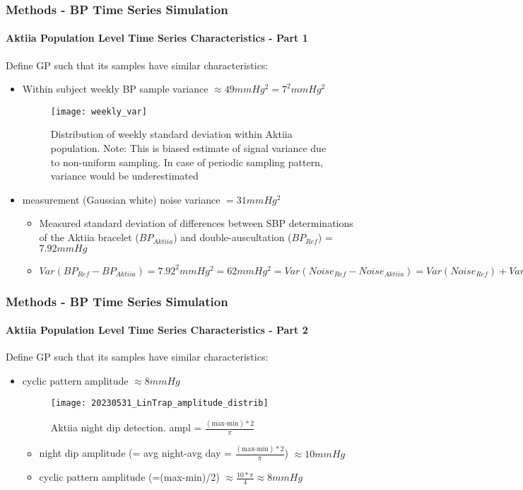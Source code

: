 \documentclass[
	8pt, %
]{beamer}
\begin{document}
\begin{frame}
	\frametitle{Methods - BP Time Series Simulation}
	\framesubtitle{Aktiia Population Level Time Series Characteristics - Part 1}

	Define GP such that its samples have similar characteristics:

	\begin{itemize}
		\item Within subject weekly BP sample variance $\approx 49 mmHg^2 = 7^2 mmHg^2$
			\begin{figure}
					\texttt{[image: weekly\_var]}
					\caption{Distribution of weekly standard deviation within Aktiia population.
					Note: This is biased estimate of signal variance due to non-uniform sampling. In case
					of periodic sampling pattern, variance would be underestimated}
			\end{figure}
		\item measurement (Gaussian white) noise variance $=31 mmHg^2$
		\begin{itemize}
			\item Measured standard deviation of differences between SBP determinations of the Aktiia bracelet
			($BP_{Aktiia}$)  and double-auscultation ($BP_{Ref}$) = $7.92 mmHg$
			\item $Var(BP_{Ref} - BP_{Aktiia}) = 7.92^2 mmHg^2 = 62 mmHg^2 = Var(Noise_{Ref} - Noise_{Aktiia})
			= Var(Noise_{Ref}) + Var(Noise_{Aktiia}) - 2COV(Noise_{Ref}, Noise_{Aktiia})$
		\end{itemize}
	\end{itemize}
\end{frame}

\begin{frame}
	\frametitle{Methods - BP Time Series Simulation}
	\framesubtitle{Aktiia Population Level Time Series Characteristics - Part 2}

	Define GP such that its samples have similar characteristics:

	\begin{itemize}
		\item cyclic pattern amplitude $\approx 8 mmHg$
				\begin{figure}
					\texttt{[image: 20230531\_LinTrap\_amplitude\_distrib]}
					\caption{Aktiia night dip detection. ampl = $\frac{(\text{max-min})*2}{\pi}$}
				\end{figure}
		\begin{itemize}
			\item night dip amplitude (= avg night-avg day = $\frac{(\text{max-min})*2}{\pi}$) $ \approx 10 mmHg$
			\item cyclic pattern amplitude (=(max-min)/2) $\approx \frac{10 *\pi}{4} \approx 8 mmHg$
		\end{itemize}

	\end{itemize}

\end{frame}
\end{document}

